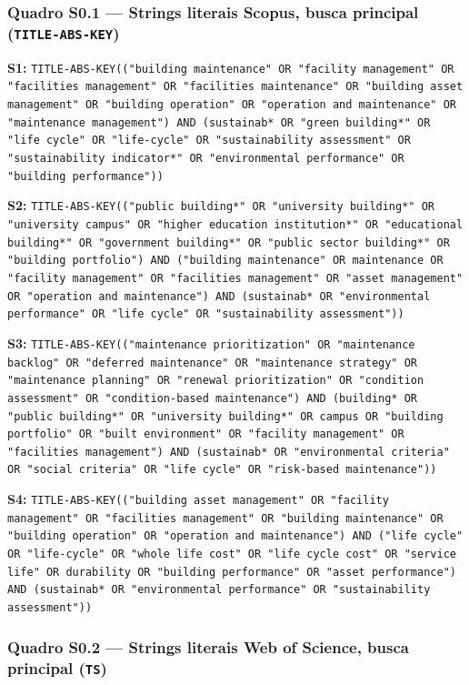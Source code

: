 \subsubsection*{Quadro S0.1 --- Strings literais Scopus, busca principal (\texttt{TITLE-ABS-KEY})}

\small
\noindent\textbf{S1:} \texttt{TITLE-ABS-KEY(("building maintenance" OR "facility management" OR "facilities management" OR "facilities maintenance" OR "building asset management" OR "building operation" OR "operation and maintenance" OR "maintenance management") AND (sustainab* OR "green building*" OR "life cycle" OR "life-cycle" OR "sustainability assessment" OR "sustainability indicator*" OR "environmental performance" OR "building performance"))}

\medskip
\noindent\textbf{S2:} \texttt{TITLE-ABS-KEY(("public building*" OR "university building*" OR "university campus" OR "higher education institution*" OR "educational building*" OR "government building*" OR "public sector building*" OR "building portfolio") AND ("building maintenance" OR maintenance OR "facility management" OR "facilities management" OR "asset management" OR "operation and maintenance") AND (sustainab* OR "environmental performance" OR "life cycle" OR "sustainability assessment"))}

\medskip
\noindent\textbf{S3:} \texttt{TITLE-ABS-KEY(("maintenance prioritization" OR "maintenance backlog" OR "deferred maintenance" OR "maintenance strategy" OR "maintenance planning" OR "renewal prioritization" OR "condition assessment" OR "condition-based maintenance") AND (building* OR "public building*" OR "university building*" OR campus OR "building portfolio" OR "built environment" OR "facility management" OR "facilities management") AND (sustainab* OR "environmental criteria" OR "social criteria" OR "life cycle" OR "risk-based maintenance"))}

\medskip
\noindent\textbf{S4:} \texttt{TITLE-ABS-KEY(("building asset management" OR "facility management" OR "facilities management" OR "building maintenance" OR "building operation" OR "operation and maintenance") AND ("life cycle" OR "life-cycle" OR "whole life cost" OR "life cycle cost" OR "service life" OR durability OR "building performance" OR "asset performance") AND (sustainab* OR "environmental performance" OR "sustainability assessment"))}

\subsubsection*{Quadro S0.2 --- Strings literais Web of Science, busca principal (\texttt{TS})}

